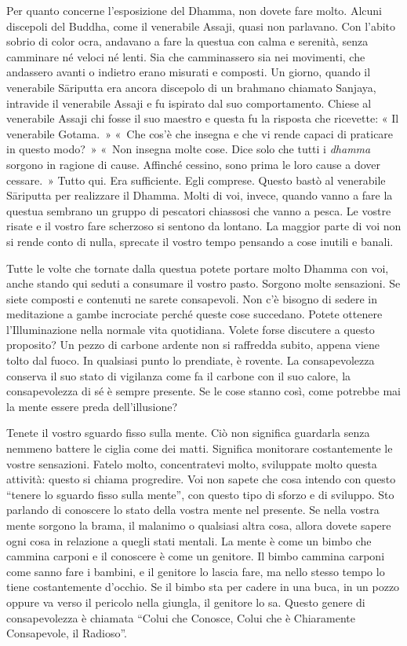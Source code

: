 Per quanto concerne l'esposizione del Dhamma, non dovete fare molto.
Alcuni discepoli del Buddha, come il venerabile Assaji, quasi non
parlavano. Con l'abito sobrio di color ocra, andavano a fare la questua
con calma e serenità, senza camminare né veloci né lenti. Sia che
camminassero sia nei movimenti, che andassero avanti o indietro erano
misurati e composti. Un giorno, quando il venerabile Sāriputta era
ancora discepolo di un brahmano chiamato Sanjaya, intravide il
venerabile Assaji e fu ispirato dal suo comportamento. Chiese al
venerabile Assaji chi fosse il suo maestro e questa fu la risposta che
ricevette: « Il venerabile Gotama.~» «~Che cos'è che insegna e che vi
rende capaci di praticare in questo modo?~» «~Non insegna molte cose.
Dice solo che tutti i \emph{dhamma} sorgono in ragione di cause.
Affinché cessino, sono prima le loro cause a dover cessare.~» Tutto qui.
Era sufficiente. Egli comprese. Questo bastò al venerabile Sāriputta per
realizzare il Dhamma. Molti di voi, invece, quando vanno a fare la
questua sembrano un gruppo di pescatori chiassosi che vanno a pesca. Le
vostre risate e il vostro fare scherzoso si sentono da lontano. La
maggior parte di voi non si rende conto di nulla, sprecate il vostro
tempo pensando a cose inutili e banali.

Tutte le volte che tornate dalla questua potete portare molto Dhamma con
voi, anche stando qui seduti a consumare il vostro pasto. Sorgono molte
sensazioni. Se siete composti e contenuti ne sarete consapevoli. Non c'è
bisogno di sedere in meditazione a gambe incrociate perché queste cose
succedano. Potete ottenere l'Illuminazione nella normale vita
quotidiana. Volete forse discutere a questo proposito? Un pezzo di
carbone ardente non si raffredda subito, appena viene tolto dal fuoco.
In qualsiasi punto lo prendiate, è rovente. La consapevolezza conserva
il suo stato di vigilanza come fa il carbone con il suo calore, la
consapevolezza di sé è sempre presente. Se le cose stanno così, come
potrebbe mai la mente essere preda dell'illusione?

Tenete il vostro sguardo fisso sulla mente. Ciò non significa guardarla
senza nemmeno battere le ciglia come dei matti. Significa monitorare
costantemente le vostre sensazioni. Fatelo molto, concentratevi molto,
sviluppate molto questa attività: questo si chiama progredire. Voi non
sapete che cosa intendo con questo ``tenere lo sguardo fisso sulla
mente'', con questo tipo di sforzo e di sviluppo. Sto parlando di
conoscere lo stato della vostra mente nel presente. Se nella vostra
mente sorgono la brama, il malanimo o qualsiasi altra cosa, allora
dovete sapere ogni cosa in relazione a quegli stati mentali. La mente è
come un bimbo che cammina carponi e il conoscere è come un genitore. Il
bimbo cammina carponi come sanno fare i bambini, e il genitore lo lascia
fare, ma nello stesso tempo lo tiene costantemente d'occhio. Se il bimbo
sta per cadere in una buca, in un pozzo oppure va verso il pericolo
nella giungla, il genitore lo sa. Questo genere di consapevolezza è
chiamata ``Colui che Conosce, Colui che è Chiaramente Consapevole, il
Radioso''.

